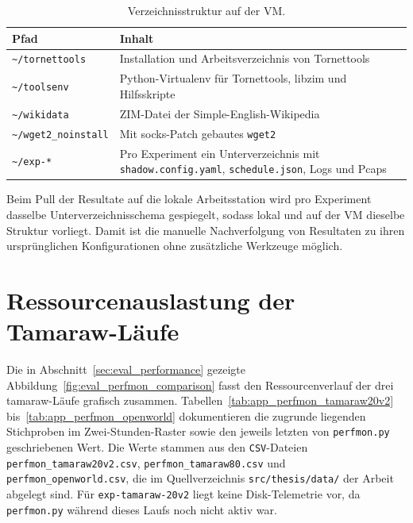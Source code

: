 \begin{table}[H]
\centering
\caption{Verzeichnisstruktur auf der VM.}
\label{tab:serverumgebung_struktur}
\begin{tabularx}{\textwidth}{l>{\raggedright\arraybackslash}X}
\hline
Pfad & Inhalt \\
\hline
\texttt{\textasciitilde/tornettools} & Installation und Arbeitsverzeichnis von Tornettools \\
\texttt{\textasciitilde/toolsenv} & Python-Virtualenv für Tornettools, libzim und Hilfsskripte \\
\texttt{\textasciitilde/wikidata} & ZIM-Datei der Simple-English-Wikipedia \\
\texttt{\textasciitilde/wget2\_noinstall} & Mit \gls{socks}-Patch gebautes \texttt{wget2} \\
\texttt{\textasciitilde/exp-*} & Pro Experiment ein Unterverzeichnis mit \texttt{shadow.config.yaml}, \texttt{schedule.json}, Logs und Pcaps \\
\hline
\end{tabularx}
\end{table}

Beim Pull der Resultate auf die lokale Arbeitsstation wird pro Experiment dasselbe Unterverzeichnisschema gespiegelt, sodass lokal und auf der VM dieselbe Struktur vorliegt.
Damit ist die manuelle Nachverfolgung von Resultaten zu ihren ursprünglichen Konfigurationen ohne zusätzliche Werkzeuge möglich.

\section{Ressourcenauslastung der Tamaraw-Läufe}
\label{app:serverumgebung_perfmon}

Die in Abschnitt~\ref{sec:eval_performance} gezeigte Abbildung~\ref{fig:eval_perfmon_comparison} fasst den Ressourcenverlauf der drei \gls{tamaraw}-Läufe grafisch zusammen.
Tabellen~\ref{tab:app_perfmon_tamaraw20v2} bis~\ref{tab:app_perfmon_openworld} dokumentieren die zugrunde liegenden Stichproben im Zwei-Stunden-Raster sowie den jeweils letzten von \texttt{perfmon.py} geschriebenen Wert.
Die Werte stammen aus den \texttt{CSV}-Dateien \texttt{perfmon\_tamaraw20v2.csv}, \texttt{perfmon\_tamaraw80.csv} und \texttt{perfmon\_openworld.csv}, die im Quellverzeichnis \texttt{src/thesis/data/} der Arbeit abgelegt sind.
Für \texttt{exp-tamaraw-20v2} liegt keine Disk-Telemetrie vor, da \texttt{perfmon.py} während dieses Laufs noch nicht aktiv war.

